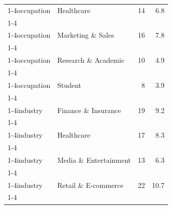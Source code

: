 \documentclass[
]{article}
\begin{document}
\begin{longtable}[t]{llrr}
\cellcolor{gray!10}{occupation} & \cellcolor{gray!10}{Finance} & \cellcolor{gray!10}{13} & \cellcolor{gray!10}{6.3}\\
\cmidrule{1-4}\pagebreak[0]
occupation & Healthcare & 14 & 6.8\\
\cmidrule{1-4}\pagebreak[0]
\cellcolor{gray!10}{occupation} & \cellcolor{gray!10}{Management \& Executive} & \cellcolor{gray!10}{18} & \cellcolor{gray!10}{8.7}\\
\cmidrule{1-4}\pagebreak[0]
occupation & Marketing \& Sales & 16 & 7.8\\
\cmidrule{1-4}\pagebreak[0]
\cellcolor{gray!10}{occupation} & \cellcolor{gray!10}{Other (please specify)} & \cellcolor{gray!10}{61} & \cellcolor{gray!10}{29.6}\\
\cmidrule{1-4}\pagebreak[0]
occupation & Research \& Academic & 10 & 4.9\\
\cmidrule{1-4}\pagebreak[0]
\cellcolor{gray!10}{occupation} & \cellcolor{gray!10}{Software \& IT} & \cellcolor{gray!10}{43} & \cellcolor{gray!10}{20.9}\\
\cmidrule{1-4}\pagebreak[0]
occupation & Student & 8 & 3.9\\
\cmidrule{1-4}\pagebreak[0]
\cellcolor{gray!10}{industry} & \cellcolor{gray!10}{Education} & \cellcolor{gray!10}{16} & \cellcolor{gray!10}{7.8}\\
\cmidrule{1-4}\pagebreak[0]
industry & Finance \& Insurance & 19 & 9.2\\
\cmidrule{1-4}\pagebreak[0]
\cellcolor{gray!10}{industry} & \cellcolor{gray!10}{Government} & \cellcolor{gray!10}{3} & \cellcolor{gray!10}{1.5}\\
\cmidrule{1-4}\pagebreak[0]
industry & Healthcare & 17 & 8.3\\
\cmidrule{1-4}\pagebreak[0]
\cellcolor{gray!10}{industry} & \cellcolor{gray!10}{Manufacturing} & \cellcolor{gray!10}{10} & \cellcolor{gray!10}{4.9}\\
\cmidrule{1-4}\pagebreak[0]
industry & Media \& Entertainment & 13 & 6.3\\
\cmidrule{1-4}\pagebreak[0]
\cellcolor{gray!10}{industry} & \cellcolor{gray!10}{Other (please specify)} & \cellcolor{gray!10}{56} & \cellcolor{gray!10}{27.2}\\
\cmidrule{1-4}\pagebreak[0]
industry & Retail \& E-commerce & 22 & 10.7\\
\cmidrule{1-4}\pagebreak[0]
\cellcolor{gray!10}{industry} & \cellcolor{gray!10}{Technology} & \cellcolor{gray!10}{50} & \cellcolor{gray!10}{24.3}\\
\bottomrule
\end{longtable}
\end{document}
